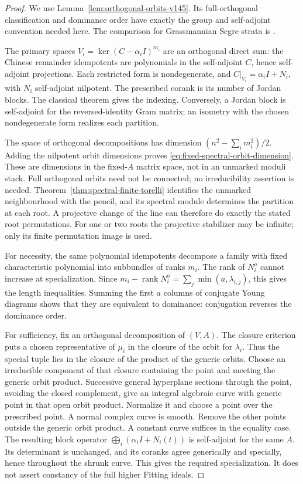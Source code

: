 \documentclass[11pt,reqno]{amsart}
\numberwithin{equation}{section}
\theoremstyle{definition}\newtheorem{definition}[theorem]{Definition}
\theoremstyle{remark}\newtheorem{remark}[theorem]{Remark}
\DeclareMathOperator{\rank}{rank}\DeclareMathOperator{\Proj}{Proj}
\begin{document}
\begin{proof}
We use Lemma~\ref{lem:orthogonal-orbits-v145}.  Its full-orthogonal
classification and dominance order have exactly the group and
self-adjoint convention needed here.  The comparison for Grassmannian
Segre strata is \cite[Theorem~5.1]{FevolaMandelshtamSturmfels}.

The primary spaces \(V_i=\ker(C-\alpha_iI)^{m_i}\) are an
orthogonal direct sum: the Chinese remainder idempotents are
polynomials in the self-adjoint \(C\), hence self-adjoint projections.
Each restricted form is nondegenerate, and
\(C|_{V_i}=\alpha_iI+N_i\), with \(N_i\) self-adjoint
nilpotent. The prescribed corank is its number of Jordan blocks.
The classical theorem gives the indexing. Conversely, a Jordan block
is self-adjoint for the reversed-identity Gram matrix; an isometry
with the chosen nondegenerate form realizes each partition.

The space of orthogonal decompositions has dimension
\((n^2-\sum_i m_i^2)/2\). Adding the nilpotent orbit dimensions
proves \eqref{eq:fixed-spectral-orbit-dimension}. These are dimensions
in the fixed-\(A\) matrix space, not in an unmarked moduli stack.
Full orthogonal orbits need not be connected; no irreducibility
assertion is needed. Theorem~\ref{thm:spectral-finite-torelli}
identifies the unmarked neighbourhood with the pencil, and its spectral
module determines the partition at each root. A projective change of
the line can therefore do exactly the stated root permutations.
For one or two roots the projective stabilizer may be infinite;
only its finite permutation image is used.

For necessity, the same polynomial idempotents decompose a family
with fixed characteristic polynomial into subbundles of ranks \(m_i\).
The rank of \(N_i^a\) cannot increase at specialization. Since
\(m_i-\rank N_i^a=\sum_j\min(a,\lambda_{i,j})\), this gives
the length inequalities. Summing the first \(a\) columns of
conjugate Young diagrams shows that they are equivalent to dominance:
conjugation reverses the dominance order.

For sufficiency, fix an orthogonal decomposition of \((V,A)\).
The closure criterion puts a chosen representative of \(\mu_i\)
in the closure of the orbit for \(\lambda_i\). Thus the special
tuple lies in the closure of the product of the generic orbits.
Choose an irreducible component of that closure containing the point
and meeting the generic orbit product. Successive general hyperplane
sections through the point, avoiding the closed complement, give an
integral algebraic curve with generic point in that open orbit product.
Normalize it and choose a point over the prescribed point. A normal
complex curve is smooth. Remove the other points outside the generic
orbit product. A constant curve suffices in the equality case.
The resulting block operator \(\bigoplus_i(\alpha_iI+N_i(t))\)
is self-adjoint for the same \(A\). Its determinant is unchanged,
and its coranks agree generically and specially, hence throughout the
shrunk curve. This gives the required specialization. It does not
assert constancy of the full higher Fitting ideals.


\end{proof}
\end{document}
